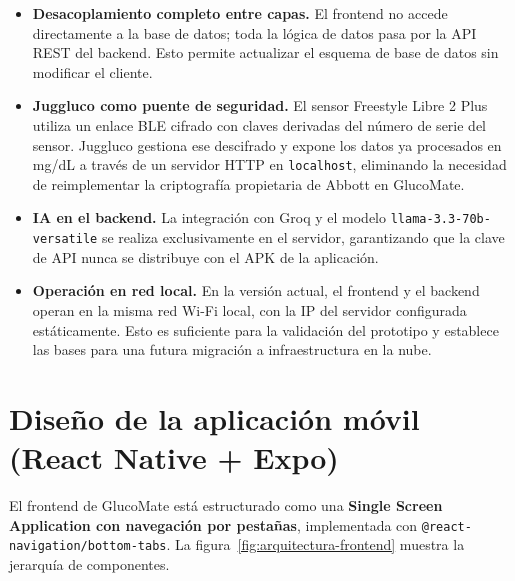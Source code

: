 \begin{itemize}
    \item \textbf{Desacoplamiento completo entre capas.} El frontend no accede
          directamente a la base de datos; toda la lógica de datos pasa por la
          API REST del backend. Esto permite actualizar el esquema de base de
          datos sin modificar el cliente.

    \item \textbf{Juggluco como puente de seguridad.} El sensor Freestyle Libre 2
          Plus utiliza un enlace BLE cifrado con claves derivadas del número de
          serie del sensor. Juggluco gestiona ese descifrado y expone los datos
          ya procesados en mg/dL a través de un servidor HTTP en \texttt{localhost},
          eliminando la necesidad de reimplementar la criptografía propietaria de
          Abbott en GlucoMate.

    \item \textbf{IA en el backend.} La integración con Groq y el modelo
          \texttt{llama-3.3-70b-versatile} se realiza
          exclusivamente en el servidor, garantizando que la clave de API nunca
          se distribuye con el APK de la aplicación.

    \item \textbf{Operación en red local.} En la versión actual, el frontend y el
          backend operan en la misma red Wi-Fi local, con la IP del servidor
          configurada estáticamente. Esto es suficiente para la validación del
          prototipo y establece las bases para una futura migración a infraestructura
          en la nube.
\end{itemize}

\section{Diseño de la aplicación móvil (React Native + Expo)}
\label{sec:arquitectura-frontend}

El frontend de GlucoMate está estructurado como una \textbf{Single Screen Application
con navegación por pestañas}, implementada con \texttt{@react-navigation/bottom-tabs}.
La figura~\ref{fig:arquitectura-frontend} muestra la jerarquía de componentes.

